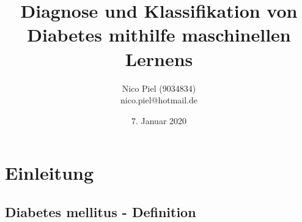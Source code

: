 \documentclass{article}
\title{Diagnose und Klassifikation von Diabetes mithilfe maschinellen Lernens}
\author{Nico Piel (9034834) \\ nico.piel@hotmail.de}
\date{7. Januar 2020}
\begin{document}
\maketitle

\newpage

\tableofcontents

\newpage

\section{Einleitung}

\subsection{Diabetes mellitus - Definition}
\end{document}
